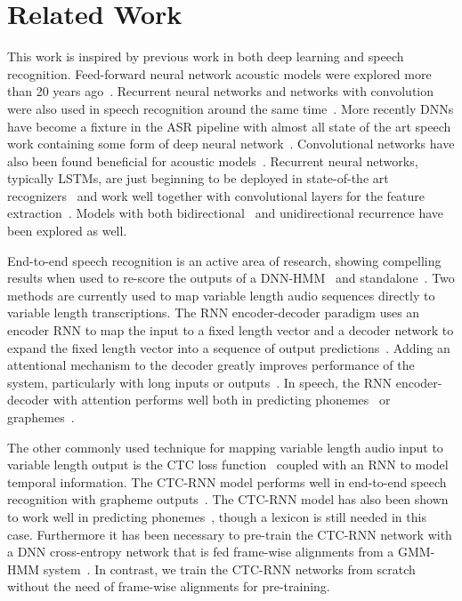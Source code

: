 \section{Related Work}
 \label{sec:deepspeech2:related}

This work is inspired by previous work in both deep learning and speech
recognition. Feed-forward neural network acoustic models were explored more
than 20 years ago~\cite{bourlard93, renals1994, ellis1999}. Recurrent neural
networks and networks with convolution were also used in speech recognition
around the same time~\cite{robinson1996, waibel1989}. More recently DNNs have
become a fixture in the ASR pipeline with almost all state of the art speech
work containing some form of deep neural network~\cite{mohamed2011, hinton2012,
dahl2011a, dahl2011, jaitly2012, seide2011}. Convolutional networks have also
been found beneficial for acoustic models~\cite{abdelhamid2012,
sainath2013deep}. Recurrent neural networks, typically LSTMs, are just
beginning to be deployed in state-of-the art recognizers~\cite{graves2013,
sak2014, sak2014b} and work well together with convolutional layers for the
feature extraction~\cite{sainath2015}. Models with both
bidirectional~\cite{graves2013} and unidirectional recurrence have been
explored as well.

End-to-end speech recognition is an active area of research, showing compelling
results when used to re-score the outputs of a DNN-HMM~\cite{graves2014} and
standalone~\cite{hannun2014deepspeech}. Two methods are currently used to map
variable length audio sequences directly to variable length transcriptions. The
RNN encoder-decoder paradigm uses an encoder RNN to map the input to a fixed
length vector and a decoder network to expand the fixed length vector into a
sequence of output predictions~\cite{cho2014, sutskever2014}. Adding an
attentional mechanism to the decoder greatly improves performance of the
system, particularly with long inputs or outputs~\cite{bahdanau2014}. In
speech, the RNN encoder-decoder with attention performs well both in predicting
phonemes~\cite{chorowski2014} or graphemes~\cite{bahdanau2016, chan2016}. 

The other commonly used technique for mapping variable length audio input to
variable length output is the CTC loss function~\cite{graves2006} coupled with
an RNN to model temporal information. The CTC-RNN model performs well in
end-to-end speech recognition with grapheme outputs~\cite{graves2014,
hannun2014firstpass, hannun2014deepspeech, maas2015}. The CTC-RNN model has
also been shown to work well in predicting phonemes~\cite{miao2015, sak2015},
though a lexicon is still needed in this case.  Furthermore it has been
necessary to pre-train the CTC-RNN network with a DNN cross-entropy network
that is fed frame-wise alignments from a GMM-HMM system~\cite{sak2015}. In
contrast, we train the CTC-RNN networks from scratch without the need of
frame-wise alignments for pre-training.

